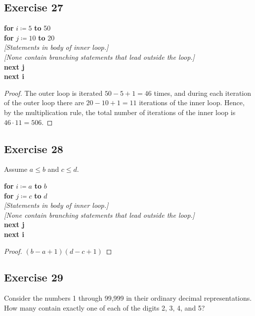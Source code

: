 \documentclass[14pt]{extarticle}
\begin{document}
\subsection{Exercise 27}
\begin{tabbing}
     {\bf for} \= \(i \coloneqq 5\) {\bf to} 50 \\
     \> {\bf for} \= \(j \coloneqq 10\) {\bf to} 20 \\
     \>           \> {\it [Statements in body of inner loop.]} \\
     \>           \> {\it [None contain branching statements that lead outside the loop.]} \\
     \> {\bf next j} \\
     {\bf next i}
\end{tabbing}

\begin{proof}
     The outer loop is iterated \(50 - 5 + 1 = 46\) times, and during each iteration of the outer loop there are
     \(20 - 10 + 1 = 11\) iterations of the inner loop. Hence, by the multiplication rule, the total number of iterations
     of the inner loop is \(46 \cdot 11 = 506\).
\end{proof}

\subsection{Exercise 28}
Assume \(a \leq b\) and \(c \leq d\).
\begin{tabbing}
     {\bf for} \= \(i \coloneqq a\) {\bf to} $b$ \\
     \> {\bf for} \= \(j \coloneqq c\) {\bf to} $d$ \\
     \>           \> {\it [Statements in body of inner loop.]} \\
     \>           \> {\it [None contain branching statements that lead outside the loop.]} \\
     \> {\bf next j} \\
     {\bf next i}
\end{tabbing}

\begin{proof}
     \((b-a+1)(d-c+1)\)
\end{proof}

\subsection{Exercise 29}
Consider the numbers 1 through 99,999 in their ordinary decimal representations. How many contain exactly one of
each of the digits 2, 3, 4, and 5?
\end{document}
